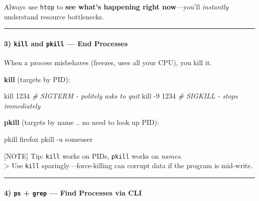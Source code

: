 \documentclass[
  english,
  paper=a4,
  oneside  ,captions=tableheading
]{scrartcl}
\newenvironment{Shaded}{}{}
\newcommand{\AttributeTok}[1]{\textcolor[rgb]{0.49,0.56,0.16}{#1}}
\newcommand{\BuiltInTok}[1]{\textcolor[rgb]{0.00,0.50,0.00}{#1}}
\newcommand{\CommentTok}[1]{\textcolor[rgb]{0.38,0.63,0.69}{\textit{#1}}}
\newcommand{\ExtensionTok}[1]{#1}
\newcommand{\NormalTok}[1]{#1}
\renewenvironment{quote}{\begin{customblockquote}\list{}{\rightmargin=0em\leftmargin=0em}%
\item\relax\color{blockquote-text}\ignorespaces}{\unskip\unskip\endlist\end{customblockquote}}
\begin{document}
\begin{quote}
Always use \texttt{htop} to \textbf{see what's happening right
now}---you'll \emph{instantly} understand resource bottlenecks.
\end{quote}

\begin{center}\rule{0.5\linewidth}{0.5pt}\end{center}

\paragraph{\texorpdfstring{3) \texttt{kill} and \texttt{pkill} --- End
Processes}{3) kill and pkill --- End Processes}}\label{kill-and-pkill-end-processes}

When a process misbehaves (freezes, uses all your CPU), you kill it.

\textbf{kill} (targets by PID):

\begin{Shaded}
\begin{Highlighting}[]
\BuiltInTok{kill}\NormalTok{ 1234               }\CommentTok{\# SIGTERM {-} politely asks to quit}
\BuiltInTok{kill} \AttributeTok{{-}9}\NormalTok{ 1234            }\CommentTok{\# SIGKILL {-} stops immediately}
\end{Highlighting}
\end{Shaded}

\textbf{pkill} (targets by name .. no need to look up PID):

\begin{Shaded}
\begin{Highlighting}[]
\ExtensionTok{pkill}\NormalTok{ firefox}
\ExtensionTok{pkill} \AttributeTok{{-}u}\NormalTok{ someuser}
\end{Highlighting}
\end{Shaded}

{[}NOTE{]} Tip: \texttt{kill} works on PIDs, \texttt{pkill} works on
\emph{names}.\\
\textgreater{} \faExclamationCircle Use \texttt{kill}
sparingly---force-killing can corrupt data if the program is mid-write.

\begin{center}\rule{0.5\linewidth}{0.5pt}\end{center}

\paragraph{\texorpdfstring{4) \texttt{ps} + \texttt{grep} --- Find
Processes via
CLI}{4) ps + grep --- Find Processes via CLI}}\label{ps-grep-find-processes-via-cli}
\end{document}
